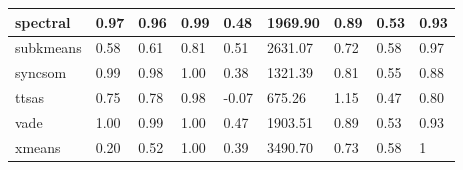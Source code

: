 \begin{table}[H]
\begin{tabular}{|l|l|l|l|l|l|l|l|l|}
\hline
spectral & 0.97 & 0.96 & 0.99 & 0.48 & 1969.90 & 0.89 & 0.53 & 0.93 \\
\hline
subkmeans & 0.58 & 0.61 & 0.81 & 0.51 & 2631.07 & 0.72 & 0.58 & 0.97 \\
\hline
syncsom & 0.99 & 0.98 & 1.00 & 0.38 & 1321.39 & 0.81 & 0.55 & 0.88 \\
\hline
ttsas & 0.75 & 0.78 & 0.98 & -0.07 & 675.26 & 1.15 & 0.47 & 0.80 \\
\hline
vade & 1.00 & 0.99 & 1.00 & 0.47 & 1903.51 & 0.89 & 0.53 & 0.93 \\
\hline
xmeans & 0.20 & 0.52 & 1.00 & 0.39 & 3490.70 & 0.73 & 0.58 & 1 \\
\hline
\end{tabular}
\end{table}



